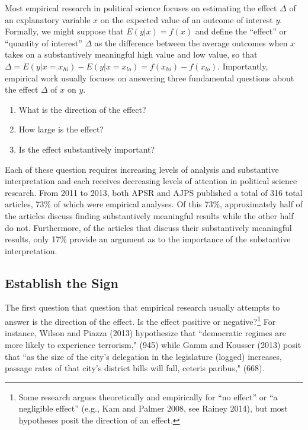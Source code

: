 \documentclass[12pt]{article}
\newcommand{\kelly}[1]{\textcolor{blue}{#1}}
\begin{document}
Most empirical research in political science focuses on estimating the effect $\Delta$ of an explanatory variable $x$ on the expected value of an outcome of interest $y$. Formally, we might suppose that $E(y | x) = f(x)$ and define the ``effect'' or ``quantity of interest'' $\Delta$ as the difference between the average outcomes when $x$ takes on a substantively meaningful high value and low value, so that $\Delta = E(y | x = x_{hi}) - E(y | x = x_{lo}) = f(x_{hi}) - f(x_{lo})$. Importantly, empirical work usually focuses on answering three fundamental questions about the effect $\Delta$ of $x$ on $y$. 

\begin{enumerate}
\item What is the direction of the effect?
\item How large is the effect?
\item Is the effect substantively important?
\end{enumerate}

Each of these question requires increasing levels of analysis and substantive interpretation and each receives decreasing levels of attention in political science research. From 2011 to 2013, both APSR and AJPS published a total of 316 total articles, 73\% of which were empirical analyses. Of this 73\%, approximately half of the articles discuss finding substantively meaningful results while the other half do not. Furthermore, of the articles that discuss their substantively meaningful results, only 17\% provide an argument as to the importance of the substantive interpretation. %

\subsection*{Establish the Sign}

The first question that question that empirical research usually attempts to answer is the direction of the effect. Is the effect positive or negative?\footnote{Some research argues theoretically and empirically for ``no effect'' or ``a negligible effect'' (e.g., Kam and Palmer 2008, see Rainey 2014), but most hypotheses posit the direction of an effect.} For instance, Wilson and Piazza (2013) hypothesize that ``democratic regimes are more likely to experience terrorism," (945) while Gamm and Kousser (2013) posit that ``as the size of the city's delegation in the legislature (logged) increases, passage rates of that city's district bills will fall, ceteris paribus," (668). 
\end{document}
